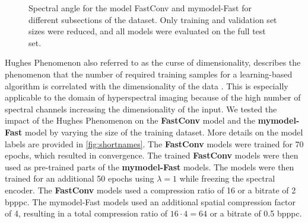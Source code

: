 \begin{figure}[!ht]
    \centering
{}\datatable
{}
\caption[Comparison for Different Dataset Sizes (Spectral Angle)]{Spectral angle for the model FastConv and \ac{mymodel}-Fast for different subsections of the dataset. Only training and validation set sizes were reduced, and all models were evaluated on the full test set.}
\label{fig:hughesangle}
\end{figure}

Hughes Phenomenon also referred to as the curse of dimensionality, describes the phenomenon that the number of required training samples for a learning-based algorithm is correlated with the dimensionality of the data \citep{hughes_mean_1968}. This is especially applicable to the domain of hyperspectral imaging because of the high number of spectral channels increasing the dimensionality of the input. We tested the impact of the Hughes Phenomenon on the \textbf{FastConv} model and the \textbf{\ac{mymodel}-Fast} model by varying the size of the training dataset. More details on the model labels are provided in \autoref{fig:shortnames}. The \textbf{FastConv} models were trained for 70 epochs, which resulted in convergence.
The trained \textbf{FastConv} models were then used as pre-trained parts of the \textbf{\ac{mymodel}-Fast} models. The models were then trained for an additional 50 epochs using $\lambda=1$ while freezing the spectral encoder. 
The \textbf{FastConv} models used a compression ratio of 16 or a bitrate of 2 \ac{bpppc}. The \ac{mymodel}-Fast models used an additional spatial compression factor of 4, resulting in a total compression ratio of $16 \cdot 4=64$ or a bitrate of 0.5 \ac{bpppc}.

